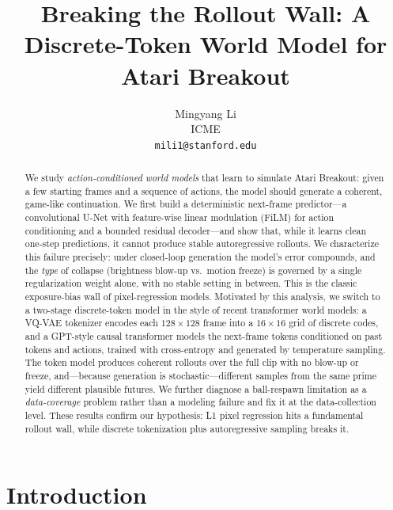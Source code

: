 \documentclass[10pt,twocolumn,letterpaper]{article}
\begin{document}
\title{Breaking the Rollout Wall: A Discrete-Token World Model for Atari Breakout}

\author{Mingyang Li\\
ICME\\
{\tt\small mili1@stanford.edu}
}

\maketitle

\begin{abstract}
We study \emph{action-conditioned world models} that learn to simulate Atari
Breakout: given a few starting frames and a sequence of actions, the model
should generate a coherent, game-like continuation. We first build a
deterministic next-frame predictor---a convolutional U-Net with
feature-wise linear modulation (FiLM) for action conditioning and a bounded
residual decoder---and show that, while it learns clean one-step predictions,
it cannot produce stable autoregressive rollouts. We characterize this failure
precisely: under closed-loop generation the model's error compounds, and the
\emph{type} of collapse (brightness blow-up vs.\ motion freeze) is governed by a single regularization weight alone, with no stable setting in between.
This is the classic exposure-bias wall of pixel-regression models. Motivated by
this analysis, we switch to a two-stage discrete-token model in the style of
recent transformer world models: a VQ-VAE tokenizer encodes each
$128\times128$ frame into a $16\times16$ grid of discrete codes, and a GPT-style
causal transformer models the next-frame tokens conditioned on past tokens and
actions, trained with cross-entropy and generated by temperature sampling. The
token model produces coherent rollouts over the full clip with no blow-up or
freeze, and---because generation is stochastic---different samples from the same
prime yield different plausible futures. We further diagnose a ball-respawn
limitation as a \emph{data-coverage} problem rather than a modeling failure and
fix it at the data-collection level. These results confirm our hypothesis:
L1 pixel regression hits a fundamental rollout wall, while discrete tokenization
plus autoregressive sampling breaks it.
\end{abstract}

\section{Introduction}
\end{document}
